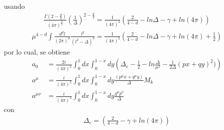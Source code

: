 usando
\begin{align}
\frac{\Gamma(2-\frac{d}{2})}{(4\pi)^{\frac{d}{2}}}\left(\frac{1}{\Delta}\right)^{2-\frac{d}{2}}=\frac{1}{(4\pi)^2}\left(\frac{2}{4-d}-ln\Delta-\gamma+ln(4\pi)\right)
\end{align}
\begin{align}
\mu^{4-d}\int\frac{d^dl}{(2\pi)^d}\frac{l^2}{(l^2-\Delta)^3}=\frac{1}{(4\pi)^2}\left(\frac{2}{4-d}-ln\Delta-\gamma+ln(4\pi)+\frac{1}{2}\right)
\end{align}
por lo cual, se obtiene
\begin{align}
a_{0}&=\frac{2i}{(4\pi)^2}\int_{0}^{1} dx \int_{0}^{1-x} dy \left(\Delta_{e}-\frac{1}{2}-ln\frac{\Delta}{\mu^2}-\frac{1}{2\Delta}(px+qy)^2)\right)\nonumber\\
a^{\mu}&=\frac{i}{(4\pi)^2}\int_{0}^{1} dx \int_{0}^{1-x} dy \frac{(p^{\mu}x+q^{\mu}y)}{\Delta}M_{k}\nonumber\\
a^{\mu\nu}&=\frac{i}{(4\pi)^2}\int_{0}^{1} dx \int_{0}^{1-x} dy \frac{q^{\mu}p^{\nu}}{\Delta}
\end{align}
con 
\begin{align}
\Delta_{e}=\left(\frac{2}{4-d}-\gamma+ln(4\pi)\right)
\end{align}